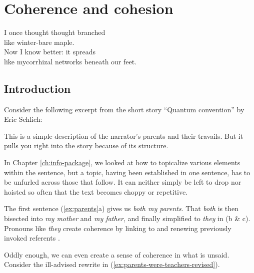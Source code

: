 \chapter{Coherence and cohesion} \label{ch:coherence}

\epigraph{I once thought thought branched\\\phantom{~~~~~~~~~} like winter-bare maple.\\
Now I know better: it spreads\\\phantom{~}\hfill 
like mycorrhizal networks beneath our feet.}{}

\section{Introduction}
Consider the following excerpt from the short story ``Quantum convention'' by Eric Schlich:
\ea \label{ex:parents}
    \z
\z

This is a simple description of the narrator's parents and their travails. But it pulls you right into the story because of its structure.

In Chapter \ref{ch:info-package}, we looked at how to topicalize various elements within the sentence, but a topic, having been established in one sentence, has to be unfurled across those that follow. It can neither simply be left to drop nor hoisted so often that the text becomes choppy or repetitive.

The first sentence (\ref{ex:parents}a) gives us \textit{both my parents}. That \textit{both} is then bisected into \textit{my mother} and \textit{my father}, and finally simplified to \textit{they} in (b \& c). Pronouns like \textit{they} create coherence by linking to and renewing previously invoked referents \citep{HallidayHasan1976,BrownYule1983}.

Oddly enough, we can even create a sense of coherence in what is unsaid. Consider the ill-advised rewrite in (\ref{ex:parents-were-teachers-revised}).

\ea \label{ex:parents-were-teachers-revised}
    \z
\z

